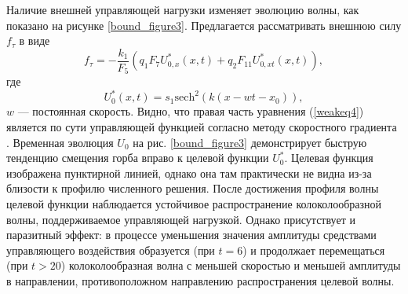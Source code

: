 Наличие внешней управляющей нагрузки изменяет эволюцию волны, как показано на рисунке \ref{bound_figure3}. Предлагается рассматривать внешнюю силу $f_\tau$ в виде
\[
f_\tau=-\frac{k_1}{F_5}\left(q_1 F_7 U^*_{0,x}(x,t)+  q_2 F_{11} U_{0,xt}^*(x,t)\right),
\]
где
\[
U^*_0(x,t)=s_1 {\text{sech}}^2 (k (x-w t-x_0)),
\]
$w$ --- постоянная скорость. Видно, что правая часть уравнения (\ref{weakeq4}) является по сути управляющей функцией согласно методу скоростного градиента \cite{bound_horizont, porant16, porant17}. Временная эволюция  $U_0$ на рис. \ref{bound_figure3} демонстрирует быструю тенденцию смещения горба вправо к целевой функции $U_0^*$. Целевая функция изображена пунктирной линией, однако она там практически не видна из-за близости к профилю численного решения. После достижения профиля волны целевой функции наблюдается устойчивое распространение колоколообразной волны, поддерживаемое управляющей нагрузкой. Однако присутствует и паразитный эффект: в процессе уменьшения значения амплитуды средствами управляющего воздействия образуется (при $t=6$) и продолжает перемещаться (при $t > 20$) колоколообразная волна с меньшей скоростью и меньшей амплитуды в направлении, противоположном направлению распространения целевой волны.


